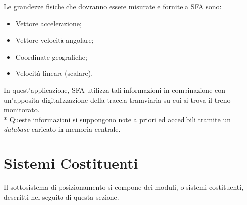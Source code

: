 Le grandezze fisiche che dovranno essere misurate e fornite a SFA sono:
\begin{itemize}
	\item Vettore accelerazione;
	\item Vettore velocit\`a angolare;
	\item Coordinate geografiche;
	\item Velocit\`a lineare (scalare).
\end{itemize}
In quest'applicazione, SFA utilizza tali informazioni in combinazione con un'apposita digitalizzazione della traccia tramviaria su cui si trova il treno monitorato.\cite{sfaimugps}\cite{sfaimuodo}\cite{sfaimuodogps} \\* Queste informazioni si suppongono note a priori ed accedibili tramite un \emph{database} caricato in memoria centrale. \cite{sqlite3}
\section{Sistemi Costituenti}
Il sottosistema di posizionamento si compone dei moduli, o sistemi costituenti, descritti nel seguito di questa sezione.

